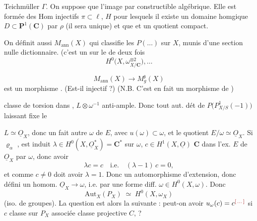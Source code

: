 \documentclass[11pt,a4paper]{article}
\begin{document}
Teichmüller $\Gamma$. On suppose que l'image \struck{\ill{}}
 par \ill{} constructible \ill{} algébrique. Elle
est formée des $\mathrm{Hom}$ injectifs $\pi \subset \ell$, $H$ pour
lesquels il existe un domaine hom\ill{}gique
$D \subset \mathbf{P}^1(\mathbf{C})$ \ill{} par $\rho$ (il sera unique) et
que   et \ill{} un
quotient compact.

On définit aussi $M_{\mathrm{ann}}(X)$ qui classifie les $P(\ldots)$
\struck{\ill{}} \ill{} sur $X$, munis d'une section nulle \ill{}
dictionnaire.  (c'est un \ill{} sur le \ill{} de deux fois
\[
  H^0\big( X, \omega^{\otimes 2}_{X/\mathbf{C}} \big), \ldots
\]

\[
  M_{\mathrm{ann}}(X) \longrightarrow M_g^{\mathfrak{z}}(X)
\]
\ill{} est un morphisme . (Est-il injectif ?) (N.B. C'est en
fait un morphisme de \ill{})

\ill{} classe de torsion dans , $L \otimes
\omega^{-1}$ anti-ample. Donc tout aut. dét\ill{} de
$P\big( P^1_{X/S}(-1) \big)$ laissant fixe le \ill{}

\ill{} $L \simeq \underline{O}_X$, donc \ill{} un fait \ill{} autre $\omega$
de $E$, avec $u(\omega) \subset \omega$, et \ill{}  le quotient
$E/\omega \simeq \underline{O}_X$. Si \ill{} $\varrho_\alpha$ \ill{}, est
induit \ill{} $\lambda \in H^0(X, \underline{O}_X^{*}) = \mathbf{C}^{*}$ sur
$\omega$,  $c \in H^1(X, \underline{O})$ \ill{}
$\mathbf{C}$ dans \ill{} l'ex. $E$ de $\underline{O}_X$ par $\omega$, \ill{}
donc avoir
\[
  \lambda c = c \quad\text{i.e.}\quad (\lambda - 1)\, c = 0,
\]
et comme $c \neq 0$ \ill{} doit avoir $\lambda = 1$. Donc \ill{} un
automorphisme d'extension, donc défini \ill{} un homom.
$\underline{O}_X \to \omega$, i.e. par une forme diff.
$\omega \in H^0(X, \omega)$. Donc
\[
  \mathrm{Aut}_X(P_X) \;\simeq\; H^0(X, \omega_X)
\]
(iso. de groupes). La question est alors la suivante : peut-on avoir
$u_\omega(c) = c^{\ill{}}$ si $c$ \struck{\ill{}}  classe
sur $P_X$ associée \ill{}  classe projective $C$,
\struck{\ill{}} ?
\end{document}
